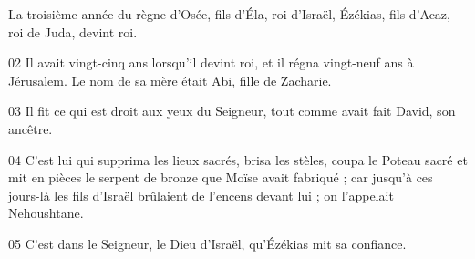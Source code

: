 La troisième année du règne d’Osée, fils d’Éla, roi d’Israël, Ézékias, fils d’Acaz, roi de Juda, devint roi.

02 Il avait vingt-cinq ans lorsqu’il devint roi, et il régna vingt-neuf ans à Jérusalem. Le nom de sa mère était Abi, fille de Zacharie.

03 Il fit ce qui est droit aux yeux du Seigneur, tout comme avait fait David, son ancêtre.

04 C’est lui qui supprima les lieux sacrés, brisa les stèles, coupa le Poteau sacré et mit en pièces le serpent de bronze que Moïse avait fabriqué ; car jusqu’à ces jours-là les fils d’Israël brûlaient de l’encens devant lui ; on l’appelait Nehoushtane.

05 C’est dans le Seigneur, le Dieu d’Israël, qu’Ézékias mit sa confiance.